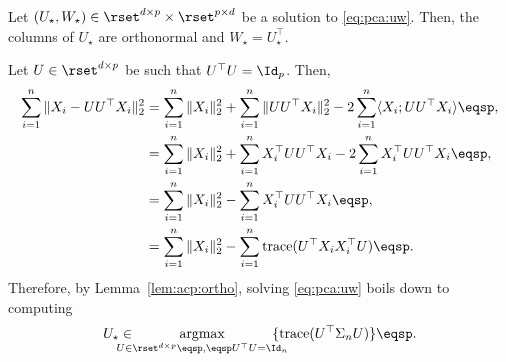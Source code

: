 \begin{shaded}
\begin{lemma} 
\label{lem:acp:ortho}
Let $(U_{\star},W_{\star})\in \rset^{d\times p}\times \rset^{p\times d}$ be a solution to \eqref{eq:pca:uw}. Then, the columns of $U_{\star}$ are orthonormal and $W_{\star} = U^\top_{\star}$.
\end{lemma}
\end{shaded}
Let $U\in\rset^{d\times p}$ be such that $U^\top U = \Id_p$. Then,
\begin{align*}
\sum_{i=1}^n\|X_i - UU^\top X_i\|_2^2 &= \sum_{i=1}^n\|X_i\|_2^2 + \sum_{i=1}^n\|UU^\top X_i\|_2^2 - 2\sum_{i=1}^n\langle X_i;UU^\top X_i\rangle\eqsp,\\
&=  \sum_{i=1}^n\|X_i\|_2^2 + \sum_{i=1}^nX^\top_iUU^\top X_i - 2\sum_{i=1}^nX^\top_iUU^\top X_i\eqsp,\\
&=  \sum_{i=1}^n\|X_i\|_2^2 - \sum_{i=1}^nX^\top_iUU^\top X_i\eqsp,\\
&=  \sum_{i=1}^n\|X_i\|_2^2 - \sum_{i=1}^n\mathrm{trace}(U^\top X_iX_i^\top U)\eqsp.
\end{align*}
Therefore, by Lemma~\ref{lem:acp:ortho}, solving \eqref{eq:pca:uw} boils down to computing
\begin{align}
\label{eq:pca:u}
U_{\star} \in \hspace{-0.5cm}\underset{U\in \rset^{d\times p}\eqsp,\eqsp U^\top U = \Id_n}{\mathrm{argmax}} \hspace{-.4cm}\{ \mathrm{trace}(U^\top\Sigma_nU)\}\eqsp.
\end{align}


